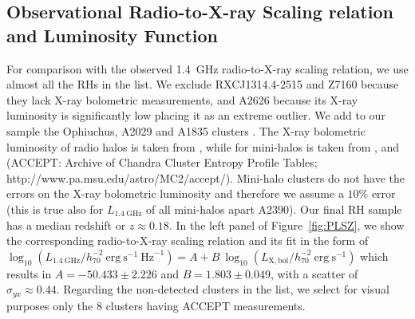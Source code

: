 \documentclass[traditabstract]{aa}
\newcommand{\rmn}{\mathrm}
\begin{document}
\begin{appendix}

\section{Observational Radio-to-X-ray Scaling relation and Luminosity Function}
\label{app:D}

For comparison with the observed 1.4~GHz radio-to-X-ray scaling relation, we use almost all the RHs in the \cite{2011A&A...527A..99E} list. We exclude RXCJ1314.4-2515 and Z7160 because they lack X-ray bolometric measurements, and A2626 because its X-ray luminosity is significantly low placing it as an extreme outlier. We add to our sample the Ophiuchus, A2029 and A1835 clusters \citep{2009A&A...499..371G}. The X-ray bolometric luminosity of radio halos is taken from \cite{2009A&A...507..661B}, while for mini-halos is taken from \cite{2002ApJ...567..716R}, \cite{Boehringer:1998vv} and \cite{2009ApJS..182...12C} (ACCEPT: Archive of Chandra Cluster Entropy Profile Tables; http://www.pa.msu.edu/astro/MC2/accept/).
Mini-halo clusters do not have the errors on the X-ray bolometric luminosity and therefore we assume a $10\%$ error (this is true also for $L_{1.4~\rmn{GHz}}$ of all mini-halos apart A2390). Our final RH sample has a median redshift or $z\approx0.18$. In the left panel of Figure~\ref{fig:PLSZ}, we show the corresponding radio-to-X-ray scaling relation and its fit in the form of $\log_{10} (L_{1.4~\rmn{GHz}}/h_{70}^{-2}~\rmn{erg}~\rmn{s}^{-1}~\rmn{Hz}^{-1}) = A + B~\log_{10} (L_{ \rmn{X,bol}}/h_{70}^{-2}~\rmn{erg}~\rmn{s}^{-1})$ which results in $A=-50.433\pm2.226$ and $B=1.803\pm0.049$, with a scatter of $\sigma_{yx} \approx 0.44$. Regarding the non-detected clusters in the \cite{2011A&A...527A..99E} list, we select for visual purposes only the 8 clusters having ACCEPT measurements. 


\end{appendix}
\end{document}
